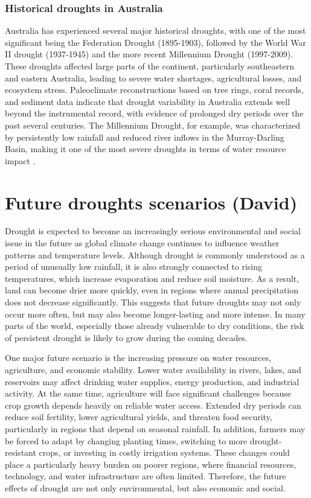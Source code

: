 \documentclass{article}
\begin{document}
\subsubsection*{Historical droughts in Australia}
Australia has experienced several major historical droughts, with one of the most significant being the Federation Drought (1895-1903), followed by the World War II drought (1937-1945) and the more recent Millennium Drought (1997-2009). These droughts affected large parts of the continent, particularly southeastern and eastern Australia, leading to severe water shortages, agricultural losses, and ecosystem stress. Paleoclimate reconstructions based on tree rings, coral records, and sediment data indicate that drought variability in Australia extends well beyond the instrumental record, with evidence of prolonged dry periods over the past several centuries. The Millennium Drought, for example, was characterized by persistently low rainfall and reduced river inflows in the Murray-Darling Basin, making it one of the most severe droughts in terms of water resource impact \parencite{BOMWhatIsDrought}.

\section*{Future droughts scenarios {\footnotesize(David)}}

Drought is expected to become an increasingly serious environmental and social issue in the future as global climate change continues to influence weather patterns and temperature levels. Although drought is commonly understood as a period of unusually low rainfall, it is also strongly connected to rising temperatures, which increase evaporation and reduce soil moisture. As a result, land can become drier more quickly, even in regions where annual precipitation does not decrease significantly. This suggests that future droughts may not only occur more often, but may also become longer-lasting and more intense. In many parts of the world, especially those already vulnerable to dry conditions, the risk of persistent drought is likely to grow during the coming decades. 

One major future scenario is the increasing pressure on water resources, agriculture, and economic stability. Lower water availability in rivers, lakes, and reservoirs may affect drinking water supplies, energy production, and industrial activity. At the same time, agriculture will face significant challenges because crop growth depends heavily on reliable water access. Extended dry periods can reduce soil fertility, lower agricultural yields, and threaten food security, particularly in regions that depend on seasonal rainfall. In addition, farmers may be forced to adapt by changing planting times, switching to more drought-resistant crops, or investing in costly irrigation systems. These changes could place a particularly heavy burden on poorer regions, where financial resources, technology, and water infrastructure are often limited. Therefore, the future effects of drought are not only environmental, but also economic and social. 
\end{document}
